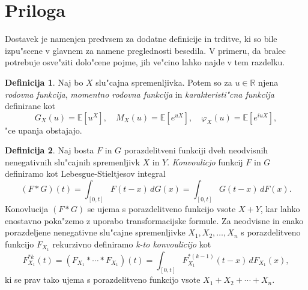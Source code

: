 \documentclass[12pt, a4paper, reqno]{amsart}
\theoremstyle{definition}
\newtheorem{definicija}{Definicija}[section]
\theoremstyle{plain}
\newcommand{\R}{\mathbb{R}}
\newcommand{\E}{\mathbb{E}}
\newcommand{\1}{\mathds{1}}
\begin{document}
        
        
        





\pagebreak

\section{Priloga}
    Dostavek je namenjen predvsem za dodatne definicije in trditve, ki so bile izpu"scene v glavnem
    za namene preglednosti besedila. V primeru, da bralec potrebuje osve"ziti dolo"cene pojme, 
    jih ve"cino lahko najde v tem razdelku.
    \begin{definicija}
        Naj bo $X$ slu"cajna spremenljivka. Potem so za $u\in\R$ njena \textit{rodovna funkcija}, 
        \textit{momentno rodovna funkcija} in \textit{karakteristi"cna funkcija} definirane 
        kot 
        \begin{equation*}
            G_X(u) = \E\left[u^X\right], \quad M_X(u) = \E\left[e^{uX}\right], \quad \varphi_X(u) = \E\left[e^{iuX}\right],
        \end{equation*}
        "ce upanja obstajajo.
        \label{def:rodovneFunkcije}
    \end{definicija}

    \begin{definicija}
        Naj bosta $F$ in $G$ porazdelitveni funkciji dveh neodvisnih nenegativnih slu"cajnih 
        spremenljivk $X$ in $Y$. \textit{Konvoulicjo} funkcij $F$ in $G$ definiramo kot
        Lebesgue-Stieltjesov integral
        \begin{equation*}
            (F*G)(t) = \int_{[0, t]}F(t - x)\, dG(x) = \int_{[0, t]}G(t - x)\, dF(x).
        \end{equation*} 
        Konovlucija $(F*G)$ se ujema s porazdelitveno funkcijo vsote $X + Y$, kar lahko 
        enostavno poka"zemo z uporabo transformacijske formule.
        Za neodvisne in enako porazdeljene nenegativne slu"cajne spremenljivke $X_1, X_2, \dots, X_n$ 
        s porazdelitveno funkcijo $F_{X_1}$ rekurzivno definiramo \textit{k-to konvoulicijo} kot
        \begin{equation*}
            F_{X_1}^{*k}(t) = (F_{X_1}*\cdots*F_{X_1})(t) = \int_{[0, t]}F_{X_1}^{*(k-1)}(t - x)\, dF_{X_1}(x),
        \end{equation*}
        ki se prav tako ujema s porazdelitveno funkcijo vsote $X_1 + X_2 + \cdots + X_n$. 



        
        \label{def:konvolucija}
    \end{definicija}
\end{document}
